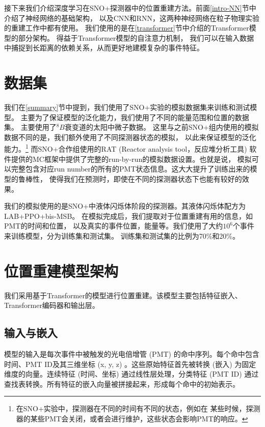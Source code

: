 接下来我们介绍深度学习在SNO+探测器中的位置重建方法。前面\ref{intro-NN}节中介绍了神经网络的基础架构，
以及CNN和RNN，这两种神经网络在粒子物理实验的重建工作中都有使用。
我们使用的是在\ref{transformer}节中介绍的Transformer模型的部分架构。
得益于Transformer模型的自注意力机制，
我们可以在输入数据中捕捉到长距离的依赖关系，从而更好地建模复杂的事件特征。

\section{数据集}\label{dataset}

我们在\ref{summary}节中提到，我们使用了SNO+实验的模拟数据集来训练和测试模型。
主要为了保证模型的泛化能力，我们使用了不同的能量范围和位置的数据集。
主要使用了${}^{8}B$衰变道的太阳中微子数据。
这里与之前SNO+组内使用的模拟数据不同的是，我们额外使用了不同探测器状态的模拟，
以此来保证模型的泛化能力。\footnote{在SNO+实验中，探测器在不同的时间有不同的状态，例如在
某些时候，探测器的某些PMT会关闭，或者会进行维护，这些状态会影响PMT的响应。}
而SNO+合作组使用的RAT (Reactor analysis tool，反应堆分析工具)
软件提供的MC框架中提供了完整的run-by-run的模拟数据设置。也就是说，
模拟可以完整包含对应run number的所有的PMT状态信息。这大大提升了训练出来的模型的鲁棒性，
使得我们在预测时，即使在不同的探测器状态下也能有较好的效果。

我们的模拟使用的是SNO+中液体闪烁体阶段的探测器。其液体闪烁体配方为LAB+PPO+bis-MSB。
在模拟完成后，我们提取对于位置重建有用的信息，如PMT的时间和位置，
以及真实的事件位置，能量等。我们使用了大约$10^6$个事件来训练模型，分为训练集和测试集。
训练集和测试集的比例为70\%和20\%。

\section{位置重建模型架构}\label{model_architecture}

我们采用基于Transformer的模型进行位置重建。该模型主要包括特征嵌入、Transformer编码器和输出层。

\subsection{输入与嵌入}
模型的输入是每次事件中被触发的光电倍增管 (PMT) 的命中序列。每个命中包含时间、PMT ID及其三维坐标 (x, y, z) 。这些原始特征首先被转换 (嵌入) 为固定维度的向量。连续特征 (时间、坐标) 通过线性层处理，分类特征 (PMT ID) 通过查找表转换。所有特征的嵌入向量被拼接起来，形成每个命中的初始表示。

